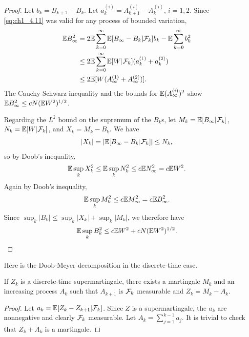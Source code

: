 \begin{proof}
Let $b_k = B_{k+1} - B_k$. Let $a_k^{(i)} = A_{k+1}^{(i)} - A_k^{(i)}$, $i = 1,2$. Since \eqref{eq:ch1_4.11} was valid for any process of bounded variation,
\mpagebreak
\begin{align*}
    \mathbb{E} B_\infty^2 &= 2\mathbb{E} \sum_{k=0}^{\infty} \mathbb{E}[B_\infty - B_k| \mathcal{F}_k]b_k - \mathbb{E} \sum_{k=0}^{\infty} b_k^2 \\
    &\leq 2\mathbb{E} \sum_{k=0}^{\infty} \mathbb{E}[W| \mathcal{F}_k](a_k^{(1)} + a_k^{(2)}) \\
    &\leq 2\mathbb{E}[W(A_\infty^{(1)} + A_\infty^{(2)})].
\end{align*}
The Cauchy-Schwarz inequality and the bounds for $\mathbb{E}(A_\infty^{(i)})^2$ show $\mathbb{E} B_\infty^2 \leq cN(\mathbb{E} W^2)^{1/2}$.

Regarding the $L^2$ bound on the supremum of the $B_k$s, let $M_k = \mathbb{E}[B_\infty| \mathcal{F}_k]$, $N_k = \mathbb{E}[W| \mathcal{F}_k]$, and $X_k = M_k - B_k$. We have
\[
    |X_k| = |\mathbb{E}[B_\infty - B_k| \mathcal{F}_k]| \leq N_k,
\]
so by Doob's inequality,
\[
    \mathbb{E} \sup_k X_k^2 \leq \mathbb{E} \sup_k N_k^2 \leq c\mathbb{E} N_\infty^2 = c\mathbb{E} W^2.
\]
Again by Doob's inequality,
\[
    \mathbb{E} \sup_k M_k^2 \leq c\mathbb{E} M_\infty^2 = c\mathbb{E} B_\infty^2.
\]
Since $\sup_k |B_k| \leq \sup_k |X_k| + \sup_k |M_k|$, we therefore have
\[
    \mathbb{E} \sup_k B_k^2 \leq c\mathbb{E} W^2 + cN(\mathbb{E} W^2)^{1/2}.
\]
\end{proof}

Here is the Doob-Meyer decomposition in the discrete-time case.

\begin{proposition}\label{prop:ch1_4.22}
If $Z_k$ is a discrete-time supermartingale, there exists a martingale $M_k$ and an increasing process $A_k$ such that $A_{k+1}$ is $\mathcal{F}_k$ measurable and $Z_k = M_k - A_k$.
\end{proposition}

\begin{proof}
Let $a_k = \mathbb{E}[Z_k - Z_{k+1}| \mathcal{F}_k]$. Since $Z$ is a supermartingale, the $a_k$ are nonnegative and clearly $\mathcal{F}_k$ measurable. Let $A_k = \sum_{j=1}^{k-1} a_j$. It is trivial to check that $Z_k + A_k$ is a martingale.
\end{proof}

